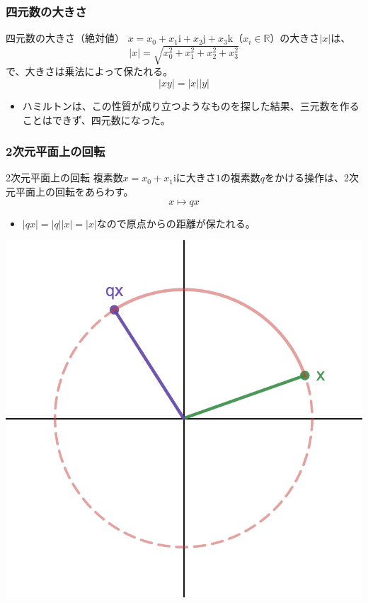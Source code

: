 \documentclass{beamer}
\newcommand{\ii}{\mathrm{i}}
\newcommand{\jj}{\mathrm{j}}
\newcommand{\kk}{\mathrm{k}}
\begin{document}
\begin{frame}
    \frametitle{四元数の大きさ}
    \begin{block}{四元数の大きさ（絶対値）}
        \(x=x_0+x_1\ii+x_2\jj+x_3\kk\)（\(x_i\in\mathbb{R}\)）の大きさ\(|x|\)は、
        \[
            |x|=\sqrt{x_0^2+x_1^2+x_2^2+x_3^2}
        \]
        で、大きさは乗法によって保たれる。
        \[
            |xy|=|x||y|
        \]
    \end{block}
    \begin{itemize}
        \item ハミルトンは、この性質が成り立つようなものを探した結果、三元数を作ることはできず、四元数になった。
    \end{itemize}
\end{frame}

\begin{frame}
    \frametitle{2次元平面上の回転}
    \begin{block}{2次元平面上の回転}
        複素数\(x=x_0+x_1\ii\)に大きさ\(1\)の複素数\(q\)をかける操作は、2次元平面上の回転をあらわす。
        \[
            x\mapsto qx
        \]
    \end{block}
    \begin{itemize}
        \item \(|qx|=|q||x|=|x|\)なので原点からの距離が保たれる。
    \end{itemize}
    \begin{center}
        \includegraphics[scale=0.12]{RotateComplex.png}
    \end{center}
\end{frame}
\end{document}
